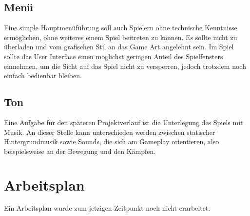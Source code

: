 \documentclass[10pt,a4paper,notitlepage]{report}
\begin{document}
\begin{flushleft}
\subsection{Menü}
Eine simple Hauptmenüführung soll auch Spielern ohne technische Kenntnisse ermöglichen, ohne weiteres einem Spiel beitreten zu können. Es sollte nicht zu überladen und vom grafischen Stil an das Game Art angelehnt sein. Im Spiel sollte das User Interface einen möglichst geringen Anteil des Spielfensters einnehmen, um die Sicht auf das Spiel nicht zu versperren, jedoch trotzdem noch einfach bedienbar bleiben. 

\subsection{Ton} 
Eine Aufgabe für den späteren Projektverlauf ist die Unterlegung des Spiels mit Musik. An dieser Stelle kann unterschieden werden zwischen statischer Hintergrundmusik sowie Sounds, die sich am Gameplay orientieren, also beispielsweise an der Bewegung und den Kämpfen.

\section{Arbeitsplan}
Ein Arbeitsplan wurde zum jetzigen Zeitpunkt noch nicht erarbeitet.


\end{flushleft}
\end{document}
